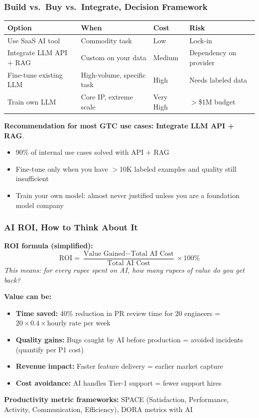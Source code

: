 \begin{frame}[fragile]\frametitle{Build vs.\ Buy vs.\ Integrate, Decision Framework}
\begin{center}
\begin{tabular}{|p{2cm}|p{2cm}|p{1cm}| p{1.5cm}|}
\hline
\textbf{Option} & \textbf{When} & \textbf{Cost} & \textbf{Risk} \\
\hline
Use SaaS AI tool & Commodity task & Low & Lock-in \\
Integrate LLM API + RAG & Custom on your data & Medium & Dependency on provider \\
Fine-tune existing LLM & High-volume, specific task & High & Needs labeled data \\
Train own LLM & Core IP, extreme scale & Very High & $>$\$1M budget \\
\hline
\end{tabular}
\end{center}

\textbf{Recommendation for most GTC use cases:} \textbf{Integrate LLM API + RAG}.
\begin{itemize}
\item 90\% of internal use cases solved with API + RAG
\item Fine-tune only when you have $>$10K labeled examples and quality still insufficient
\item Train your own model: almost never justified unless you are a foundation model company
\end{itemize}
\end{frame}

\begin{frame}[fragile]\frametitle{AI ROI, How to Think About It}
\textbf{ROI formula (simplified):}
\[
\text{ROI} = \frac{\text{Value Gained} - \text{Total AI Cost}}{\text{Total AI Cost}} \times 100\%
\]
\textit{This means: for every rupee spent on AI, how many rupees of value do you get back?}

\textbf{Value can be:}
\begin{itemize}
\item \textbf{Time saved:} 40\% reduction in PR review time for 20 engineers = $20 \times 0.4 \times \text{hourly rate}$ per week
\item \textbf{Quality gains:} Bugs caught by AI before production = avoided incidents (quantify per P1 cost)
\item \textbf{Revenue impact:} Faster feature delivery = earlier market capture
\item \textbf{Cost avoidance:} AI handles Tier-1 support = fewer support hires
\end{itemize}

\textbf{Productivity metric frameworks:} SPACE (Satisfaction, Performance, Activity, Communication, Efficiency), DORA metrics with AI
\end{frame}

